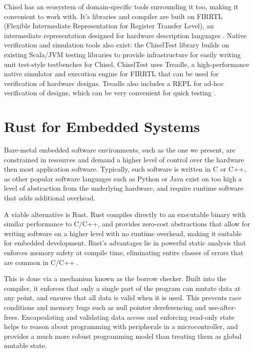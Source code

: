 Chisel has an ecosystem of domain-specific tools surrounding it too, making it convenient to work with. It's libraries and compiler are built on FIRRTL (Flexible Intermediate Representation for Register Transfer Level), an intermediate representation designed for hardware description languages \cite{firrtl}. Native verification and simulation tools also exist: the ChiselTest library builds on existing Scala/JVM testing libraries to provide infrastructure for easily writing unit test-style testbenches for Chisel. ChiselTest uses Treadle, a high-performance native simulator and execution engine for FIRRTL that can be used for verification of hardware designs. Treadle also includes a REPL for ad-hoc verification of designs, which can be very convenient for quick testing \cite{chisel_site}.

\section{Rust for Embedded Systems}

Bare-metal embedded software environments, such as the one we present, are constrained in resources and demand a higher level of control over the hardware then most application software. Typically, such software is written in C or C++, as other popular software languages such as Python or Java exist on too high a level of abstraction from the underlying hardware, and require runtime software that adds additional overhead.

A viable alternative is Rust. Rust compiles directly to an executable binary with similar performance to C/C++, and provides zero-cost abstractions that allow for writing software on a higher level with no runtime overhead, making it suitable for embedded development. Rust's advantages lie in powerful static analysis that enforces memory safety at compile time, eliminating entire classes of errors that are common in C/C++ \cite{rust_good}.

This is done via a mechanism known as the borrow checker. Built into the compiler, it enforces that only a single part of the program can mutate data at any point, and ensures that all data is valid when it is used. This prevents race conditions and memory bugs such as null pointer dereferencing and use-after-frees. Encapsulating and validating data access and enforcing read-only state helps to reason about programming with peripherals in a microcontroller, and provides a much more robust programming model than treating them as global mutable state.

